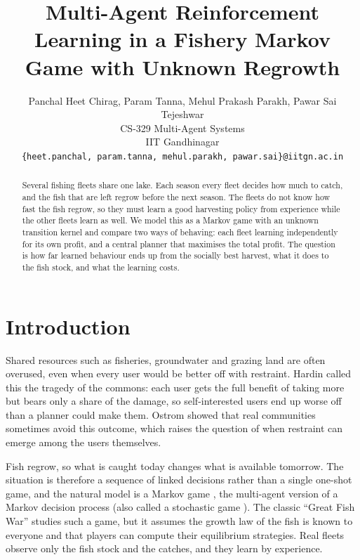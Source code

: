 \documentclass{article}
\title{Multi-Agent Reinforcement Learning in a Fishery Markov Game with Unknown Regrowth}
\author{
  Panchal Heet Chirag, Param Tanna, Mehul Prakash Parakh, Pawar Sai Tejeshwar \\
  CS-329 Multi-Agent Systems \\
  IIT Gandhinagar \\
  \texttt{\{heet.panchal, param.tanna, mehul.parakh, pawar.sai\}@iitgn.ac.in} \\
}
\begin{document}
\maketitle

\begin{abstract}
Several fishing fleets share one lake. Each season every fleet decides how much to catch, and the fish that are left regrow before the next season. The fleets do not know how fast the fish regrow, so they must learn a good harvesting policy from experience while the other fleets learn as well. We model this as a Markov game with an unknown transition kernel and compare two ways of behaving: each fleet learning independently for its own profit, and a central planner that maximises the total profit. The question is how far learned behaviour ends up from the socially best harvest, what it does to the fish stock, and what the learning costs.
\end{abstract}


\section{Introduction}
Shared resources such as fisheries, groundwater and grazing land are often overused, even when every user would be better off with restraint. Hardin \cite{hardin1968} called this the tragedy of the commons: each user gets the full benefit of taking more but bears only a share of the damage, so self-interested users end up worse off than a planner could make them. Ostrom \cite{ostrom1990} showed that real communities sometimes avoid this outcome, which raises the question of when restraint can emerge among the users themselves.

Fish regrow, so what is caught today changes what is available tomorrow. The situation is therefore a sequence of linked decisions rather than a single one-shot game, and the natural model is a Markov game \cite{littman1994}, the multi-agent version of a Markov decision process (also called a stochastic game \cite{shapley1953}). The classic ``Great Fish War'' \cite{levhari1980} studies such a game, but it assumes the growth law of the fish is known to everyone and that players can compute their equilibrium strategies. Real fleets observe only the fish stock and the catches, and they learn by experience.
\end{document}

